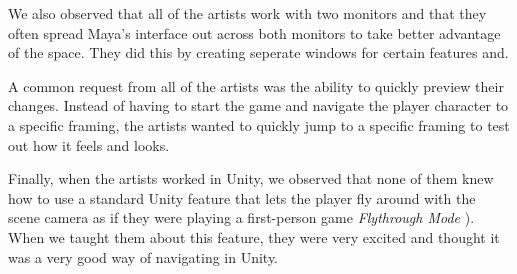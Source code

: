 We also observed that all of the artists work with two monitors and that they often spread Maya's interface out across both monitors to take better advantage of the space. They did this by creating seperate windows for certain features and. 

A common request from all of the artists was the ability to quickly preview their changes. Instead of having to start the game and navigate the player character to a specific framing, the artists wanted to quickly jump to a specific framing to test out how it feels and looks.

Finally, when the artists worked in Unity, we observed that none of them knew how to use a standard Unity feature that lets the player fly around with the scene camera as if they were playing a first-person game \textit{Flythrough Mode} \cite{unity_flyMode}). When we taught them about this feature, they were very excited and thought it was a very good way of navigating in Unity. 





